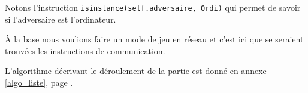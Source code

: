 Notons l'instruction \texttt{isinstance(self.adversaire, Ordi)} qui permet de savoir si l'adversaire est l'ordinateur.

\medskip

À la base nous voulions faire un mode de jeu en réseau et c'est ici que se seraient trouvées les instructions de communication.

\medskip

L'algorithme décrivant le déroulement de la partie est donné en annexe \ref{algo_liste}, page \pageref{algo_partie}.

%
